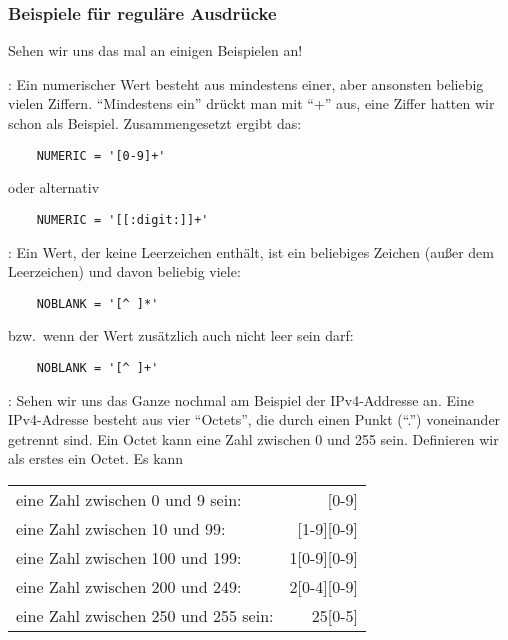 \subsubsection{Beispiele für reguläre Ausdrücke}

Sehen wir uns das mal an einigen Beispielen an!

: Ein numerischer Wert besteht aus mindestens einer, aber ansonsten
beliebig vielen Ziffern. "`Mindestens ein"' drückt man
mit "`+"' aus, eine Ziffer hatten wir schon als Beispiel. Zusammengesetzt
ergibt das:

\begin{example}
\begin{verbatim}
    NUMERIC = '[0-9]+'
\end{verbatim}
\end{example}
oder alternativ
\begin{example}
\begin{verbatim}
    NUMERIC = '[[:digit:]]+'
\end{verbatim}
\end{example}

: Ein Wert, der keine Leerzeichen enthält, ist ein beliebiges
Zeichen (außer dem Leerzeichen) und davon beliebig viele:

\begin{example}
\begin{verbatim}
    NOBLANK = '[^ ]*'
\end{verbatim}
\end{example}

bzw.\ wenn der Wert zusätzlich auch nicht leer sein darf:

\begin{example}
\begin{verbatim}
    NOBLANK = '[^ ]+'
\end{verbatim}
\end{example}

: Sehen wir uns das Ganze nochmal am Beispiel der IPv4-Addresse an. Eine
IPv4-Adresse besteht aus vier "`Octets"', die durch einen Punkt ("`."') voneinander getrennt sind. Ein
Octet kann eine Zahl zwischen 0 und 255 sein. Definieren wir als
erstes ein Octet. Es kann\\

\begin{tabular}[ht!]{lr}
  eine Zahl zwischen 0 und 9 sein: &       [0-9]\\
  eine Zahl zwischen 10 und 99: &     [1-9][0-9]\\
  eine Zahl zwischen 100 und 199:&   1[0-9][0-9]\\
  eine Zahl zwischen 200 und 249: &  2[0-4][0-9]\\
  eine Zahl zwischen 250 und 255 sein: & 25[0-5]\\
\end{tabular}\\

